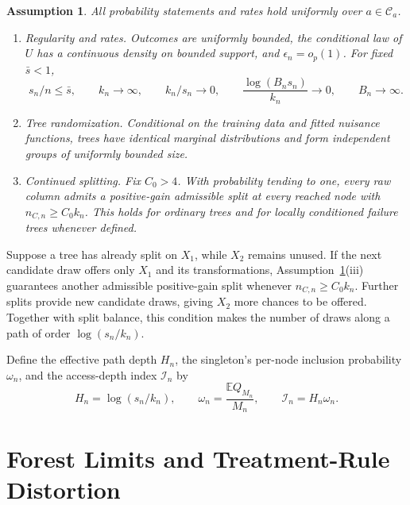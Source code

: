 \documentclass[12pt]{article}
\newtheorem{assumption}{Assumption}
\newcommand{\E}{\mathbb E}
\begin{document}
\begin{assumption}\label{ass:regularity}
All probability statements and rates hold uniformly over \(a\in\mathcal C_a\).
\begin{enumerate}
\item[(i)] \textnormal{Regularity and rates.}
Outcomes are uniformly bounded, the conditional law of \(U\) has a continuous density on bounded support, and \(\epsilon_n=o_p(1)\). For fixed \(\bar s<1\),
\begin{equation}\label{eq:rates}
s_n/n\le\bar s,\qquad
k_n\to\infty,\qquad k_n/s_n\to0,\qquad
\frac{\log(B_ns_n)}{k_n}\to0,\qquad B_n\to\infty.
\end{equation}

\item[(ii)] \textnormal{Tree randomization.}
Conditional on the training data and fitted nuisance functions, trees have identical marginal distributions and form independent groups of uniformly bounded size.

\item[(iii)] \textnormal{Continued splitting.}
Fix \(C_0>4\). With probability tending to one, every raw column admits a positive-gain admissible split at every reached node with \(n_{C,n}\ge C_0k_n\). This holds for ordinary trees and for locally conditioned failure trees whenever defined.
\end{enumerate}
\end{assumption}

Suppose a tree has already split on \(X_1\), while \(X_2\) remains unused. If the next candidate draw offers only \(X_1\) and its transformations, Assumption~\ref{ass:regularity}(iii) guarantees another admissible positive-gain split whenever \(n_{C,n}\ge C_0k_n\). Further splits provide new candidate draws, giving \(X_2\) more chances to be offered. Together with split balance, this condition makes the number of draws along a path of order \(\log(s_n/k_n)\).

Define the effective path depth \(H_n\), the singleton's per-node inclusion probability \(\omega_n\), and the access-depth index \(\mathcal I_n\) by
\begin{equation}\label{eq:access-index}
H_n=\log(s_n/k_n),
\qquad
\omega_n=\frac{\E Q_{M_n}}{M_n},
\qquad
\mathcal I_n=H_n\omega_n.
\end{equation}

\section{Forest Limits and Treatment-Rule Distortion}\label{sec:results}
\end{document}
